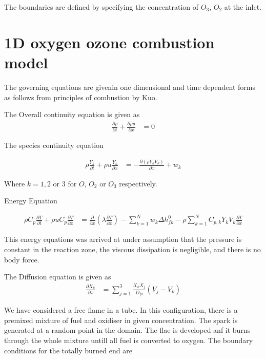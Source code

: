 \noindent The boundaries are defined by specifying the concentration of $O_3$, $O_2$ at the inlet. 

 \bigskip
 
\section{1D oxygen ozone combustion model}

\noindent The governing equations are givenin one dimensional and time dependent forms as follows from principles of combustion by Kuo.  

The Overall continuity equation is given as
\begin{eqnarray}
\frac{\partial \rho}{\partial t} +  \frac{\partial \rho u }{\partial x} &= 0
\end{eqnarray}

The species continuity equation

\begin{eqnarray}
\rho \frac{Y_k}{\partial t} + \rho u \frac{Y_k}{\partial x} &= -\frac{\partial (\rho Y_k V_k)}{\partial x}  + w_k
\end{eqnarray}

\noindent Where $k = 1, 2$ or  $3$ for $O$, $O_2$ or $O_3$ respectively. 

Energy Equation 

\begin{eqnarray}
\rho C_p \frac{\partial T}{\partial t} + \rho u C_p \frac{\partial T}{\partial x} &= \frac{\partial }{\partial x} \left(\lambda \frac{\partial T}{\partial x}\right)  - \sum_{k=1}^{N} w_k \Delta h^0_{fk} - \rho  \sum_{k=1}^{N} C_{p,k} Y_k V_k \frac{\partial T}{\partial x}
\end{eqnarray}

\noindent This energy equations was arrived at under assumption that the pressure is constant in the reaction zone, the viscous dissipation is negligible, and there is no body force. 

\noindent The Diffusion equation is given as 
\begin{eqnarray}
\frac{\partial X_k}{\partial x} &= \sum_{j=1}^{3} \frac{X_k X_j}{D_{jk}} (V_j - V_k)
\end{eqnarray}

\noindent We have considered a free flame in a tube. In this configuration, there is a premixed mixture of fuel and oxidiser in given concentration. The spark is generated at a random point in the domain. The flae is developed anf it burns through the whole mixture untill all fuel is converted to oxygen. The boundary conditions for the totally burned end are 

